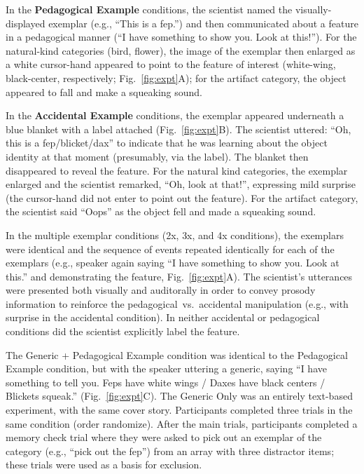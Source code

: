 \documentclass[10pt,letterpaper]{article}
\begin{document}
In the \textbf{Pedagogical Example} conditions, the scientist named the visually-displayed exemplar (e.g., ``This is a fep.'') and then communicated about a feature in a pedagogical manner (``I have something to show you. Look at this!''). 
For the natural-kind categories (bird, flower), the image of the exemplar then enlarged as a white cursor-hand appeared to point to the feature of interest (white-wing, black-center, respectively; Fig.~\ref{fig:expt}A); for the artifact category, the object appeared to fall and make a squeaking sound. 

In the \textbf{Accidental Example} conditions, the exemplar appeared underneath a blue blanket with a label attached (Fig.~\ref{fig:expt}B). 
The scientist uttered: ``Oh, this is a fep/blicket/dax'' to indicate that he was learning about the object identity at that moment (presumably, via the label).
The blanket then disappeared to reveal the feature.
For the natural kind categories, the exemplar enlarged and the scientist remarked, ``Oh, look at that!'', expressing mild surprise (the cursor-hand did not enter to point out the feature). 
For the artifact category, the scientist said ``Oops'' as the object fell and made a squeaking sound.

In the multiple exemplar conditions (2x, 3x, and 4x conditions), the exemplars were identical and the sequence of events repeated identically for each of the exemplars (e.g., speaker again saying ``I have something to show you. Look at this.'' and demonstrating the feature, Fig.~\ref{fig:expt}A).
The scientist's utterances were presented both visually and auditorally in order to convey prosody information to reinforce the pedagogical~vs.~accidental manipulation (e.g., with surprise in the accidental condition).
In neither accidental or pedagogical conditions did the scientist explicitly label the feature. 


The Generic + Pedagogical Example condition was identical to the Pedagogical Example condition, but with the speaker uttering a generic, saying ``I have something to tell you. Feps have white wings / Daxes have black centers / Blickets squeak.'' (Fig.~\ref{fig:expt}C). 
The Generic Only was an entirely text-based experiment, with the same cover story. 
Participants completed three trials in the same condition (order randomize).
After the main trials, participants completed a memory check trial where they were asked to pick out an exemplar of the category (e.g., ``pick out the fep'') from an array with three distractor items; these trials were used as a basis for exclusion.
\end{document}
